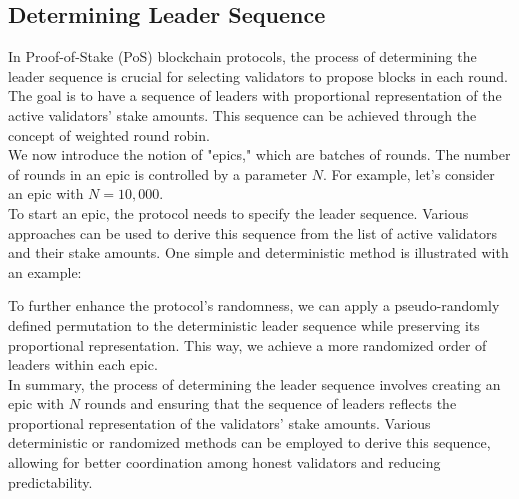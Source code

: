 \subsection{Determining Leader Sequence}
In Proof-of-Stake (PoS) blockchain protocols, the process of determining the leader sequence is crucial for selecting validators to propose blocks in each round. The goal is to have a sequence of leaders with proportional representation of the active validators' stake amounts. This sequence can be achieved through the concept of weighted round robin.\\
We now introduce the notion of "epics," which are batches of rounds. The number of rounds in an epic is controlled by a parameter \(N\). For example, let's consider an epic with \(N = 10,000\).\\
To start an epic, the protocol needs to specify the leader sequence. Various approaches can be used to derive this sequence from the list of active validators and their stake amounts. One simple and deterministic method is illustrated with an example:\\

To further enhance the protocol's randomness, we can apply a pseudo-randomly defined permutation to the deterministic leader sequence while preserving its proportional representation. This way, we achieve a more randomized order of leaders within each epic.\\

In summary, the process of determining the leader sequence involves creating an epic with \(N\) rounds and ensuring that the sequence of leaders reflects the proportional representation of the validators' stake amounts. Various deterministic or randomized methods can be employed to derive this sequence, allowing for better coordination among honest validators and reducing predictability.

